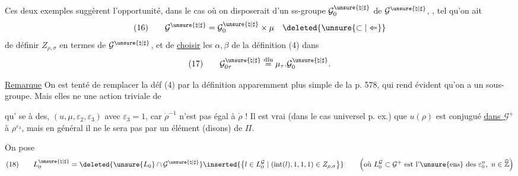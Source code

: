 Ces deux  exemples suggèrent l'opportunité,
dans le cas  où on disposerait d'un ss-groupe
 $\mathcal{G}^{\unsure{\natural|\sharp}}_0$
de $\mathcal{G}^{\unsure{\natural|\sharp}}$,
, tel qu'on ait
\[
(16)\qquad
\mathcal{G}^{\unsure{\natural|\sharp}}
=\mathcal{G}^{\unsure{\natural|\sharp}}_0\times\mu
\quad\deleted{\unsure{\subset|\Leftarrow}}
\]
de définir $Z_{\rho,\sigma}$ en termes de
$\mathcal{G}^{\unsure{\natural|\sharp}}$, et de
\uline{choisir} les $\alpha,\beta$ de la définition (4) dans
\[
(17)\qquad
\mathcal{G}^{\unsure{\natural|\sharp}}_{0\tau}
\overset{\mathrm{dfn}}{=}
\mu_\tau.\mathcal{G}^{\unsure{\natural|\sharp}}_0.
\]

\uline{Remarque} On est tenté de remplacer la déf (4)
par la définition apparemment plus simple de la p. 578,
qui rend évident qu'on a un sous-groupe.
Mais elles ne 
une action triviale de



qu' se  à des, $(u,\mu,\varepsilon_2,\varepsilon_3)$ avec $\varepsilon_3=1$,
car $\dot{\rho}^{-1}$ n'est pas égal à $\dot{\rho}$ ! Il est vrai 
(dans le cas universel p. ex.) que $u(\rho)$ est conjugué \uline{dans $\mathcal{G}^{+}$}
à $\rho^{\varepsilon_3}$, mais en général il ne le sera pas par un élément (disons) de $\Pi$.

On pose
\[
(18)\qquad
L_0^{\unsure{\natural|\sharp}}
=\deleted{\unsure{L_0}\cap\mathcal{G}^{\unsure{\natural|\sharp}}}
\inserted{\bigl\{l\in L_0^{\mathcal{G}}\mid
(\operatorname{int}(l),1,1,1)\in Z_{\rho,\sigma}\bigr\}}
\qquad
\left(\text{où }L_0^{\mathcal{G}}\subset\mathcal{G}^{+}
\text{ est l'\unsure{ens} des }\varepsilon_0^n,\ n\in\widehat{\mathbb{Z}}\right)
\]

